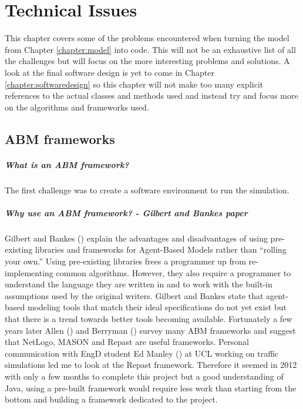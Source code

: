 \chapter{Technical Issues}\label{chapter:technicalissues}
This chapter covers some of the problems encountered when turning the model from Chapter \ref{chapter:model} into code. This will not be an exhaustive list of all the challenges but will focus on the more interesting problems and solutions. A look at the final software design is yet to come in Chapter \ref{chapter:softwaredesign} so this chapter will not make too many explicit references to the actual classes and methods used and instead try and focus more on the algorithms and frameworks used.

  \section{ABM frameworks}
    \paragraph{What is an ABM framework?}
    The first challenge was to create a software environment to run the simulation. 
    \paragraph{Why use an ABM framework? - Gilbert and Bankes paper}
    Gilbert and Bankes (\cite{Gilbert2002}) explain the advantages and
    disadvantages of using pre-existing libraries and frameworks for Agent-Based Models rather
    than ``rolling your own.'' Using pre-existing libraries frees a
    programmer up from re-implementing common
    algorithms. However, they also require a programmer to understand the
    language they are written in and to work with the built-in
    assumptions used by the original writers. Gilbert and Bankes state
    that agent-based modeling tools that match their ideal specifications
    do not yet exist but that there is a trend towards better
    tools becoming available. Fortunately a few years later Allen (\cite{Allan2009}) and Berryman (\cite{Berryman2008}) survey many ABM frameworks and suggest that NetLogo, MASON and Repast are useful frameworks. Personal communication with EngD student Ed Manley (\cite{Manley2012}) at UCL working on traffic simulations led me to look at the Repast framework. Therefore it seemed in 2012 with only a few months to complete this project but a good understanding of Java, using a pre-built framework would require less work than starting from the bottom and building a framework dedicated to the project.
